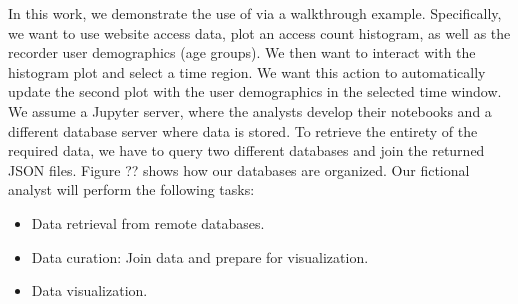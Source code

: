 In this work, we demonstrate the use of {\projname} via a walkthrough example. Specifically, we want to use website access data, plot an access count histogram, as well as the recorder user demographics (age groups). We then want to interact with the histogram plot and select a time region. We want this action to automatically update the second plot with the user demographics in the selected time window. We assume a Jupyter server, where the analysts develop their notebooks and a different database server where data is stored. To retrieve the entirety of the required data, we have to query two different databases and join the returned JSON files. Figure ?? shows how our databases are organized. Our fictional analyst will perform the following tasks:

\begin{itemize}
	\item Data retrieval from remote databases. 
	\item Data curation: Join data and prepare for visualization.
	\item Data visualization.
\end{itemize}


